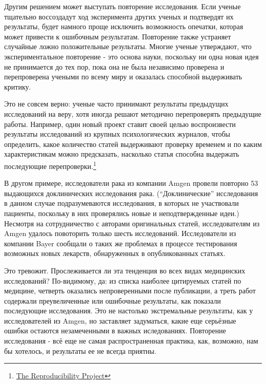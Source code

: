 Другим решением может выступать повторение исследования. Если ученые тщательно воссоздадут ход эксперимента других ученых и подтвердят их результаты, будет намного проще исключить возможность опечатки, которая может привести к ошибочным результатам. Повторение также устраняет случайные ложно положительные результаты. Многие ученые утверждают, что экспериментальное повторение - это основа науки, поскольку ни одна новая идея не принимается до тех пор, пока она не была независимо проверена и перепроверена учеными по всему миру и оказалась способной выдерживать критику.  

Это не совсем верно: ученые часто принимают результаты предыдущих исследований на веру, хотя иногда решают методично перепроверять предыдущие работы. Например, один новый проект ставит своей целью воспроизвести результаты исследований из крупных психологических журналов, чтобы определить, какое количество статей выдерживают проверку временем и по каким характеристикам можно предсказать, насколько статья способна выдержать последующие перепроверки.\footnote{\href{http://openscienceframework.org/reproducibility/}{The Reproducibility Project}} 

В другом примере, исследователи рака из компании Amgen провели повторно 53 выдающихся доклинических исследования рака. (``Доклинические'' исследования в данном случае подразумеваются исследования, в которых не участвовали пациенты, поскольку в них проверялись новые и неподтвержденные идеи.) Несмотря на сотрудничество с авторами оригинальных статей, исследователям из Amgen удалось повоторить только шесть исследований.\cite{begley_drug_2012} Исследователи из компании Bayer сообщали о таких же проблемах в процессе тестирования возможных новых лекарств, обнаруженных в опубликованных статьях.\cite{prinz_believe_2011}

Это тревожит. Прослеживается ли эта тенденция во всех видах медицинских исследований? По-видимому, да: из списка наиболее цитируемых статей по медицине, четверть оказались непроверенными после публикации, а треть работ содержали преувеличенные или ошибочные результаты, как показали последующие исследования.\cite{ioannidis_contradicted_2005} Это не настолько экстремальные результаты, как у исследователей из Amgen, но заставляет задуматься, какие еще серьёзные ошибки остаются незамеченными в важных иследованиях. Повторение исследования - всё еще не самая распространенная практика, как, возможно, нам бы хотелось, и результаты ее не всегда приятны.

